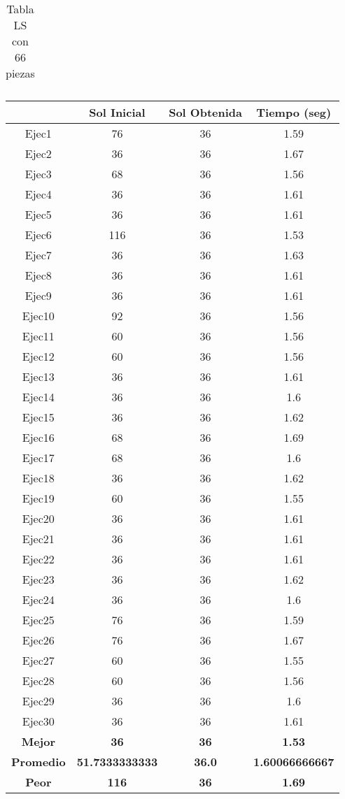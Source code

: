 \begin{center}
\begin{table}
\begin{tabular}{|c|c|c|c|}
\end{tabular}
\caption{Tabla LS con 66 piezas}
\end{table}

\begin{table}

\begin{tabular}{|c|c|c|c|}

\hline
 & {\bf Sol Inicial} & {\bf Sol Obtenida} & {\bf Tiempo (seg)} \\
\hline
Ejec1 & 76 & 36  & 1.59 \\
\hline
Ejec2 & 36 & 36  & 1.67 \\
\hline
Ejec3 & 68 & 36  & 1.56 \\
\hline
Ejec4 & 36 & 36  & 1.61 \\
\hline
Ejec5 & 36 & 36  & 1.61 \\
\hline
Ejec6 & 116 & 36  & 1.53 \\
\hline
Ejec7 & 36 & 36  & 1.63 \\
\hline
Ejec8 & 36 & 36  & 1.61 \\
\hline
Ejec9 & 36 & 36  & 1.61 \\
\hline
Ejec10 & 92 & 36  & 1.56 \\
\hline
Ejec11 & 60 & 36  & 1.56 \\
\hline
Ejec12 & 60 & 36  & 1.56 \\
\hline
Ejec13 & 36 & 36  & 1.61 \\
\hline
Ejec14 & 36 & 36  & 1.6 \\
\hline
Ejec15 & 36 & 36  & 1.62 \\
\hline
Ejec16 & 68 & 36  & 1.69 \\
\hline
Ejec17 & 68 & 36  & 1.6 \\
\hline
Ejec18 & 36 & 36  & 1.62 \\
\hline
Ejec19 & 60 & 36  & 1.55 \\
\hline
Ejec20 & 36 & 36  & 1.61 \\
\hline
Ejec21 & 36 & 36  & 1.61 \\
\hline
Ejec22 & 36 & 36  & 1.61 \\
\hline
Ejec23 & 36 & 36  & 1.62 \\
\hline
Ejec24 & 36 & 36  & 1.6 \\
\hline
Ejec25 & 76 & 36  & 1.59 \\
\hline
Ejec26 & 76 & 36  & 1.67 \\
\hline
Ejec27 & 60 & 36  & 1.55 \\
\hline
Ejec28 & 60 & 36  & 1.56 \\
\hline
Ejec29 & 36 & 36  & 1.6 \\
\hline
Ejec30 & 36 & 36  & 1.61 \\
\hline
{\bf Mejor} & {\bf 36} & {\bf 36} & {\bf 1.53} \\
\hline
{\bf Promedio} & {\bf 51.7333333333} & {\bf 36.0} & {\bf 1.60066666667} \\
\hline
{\bf Peor} & {\bf 116} & {\bf 36} & {\bf 1.69} \\
\hline


\end{tabular}
\end{table}
\end{center}
